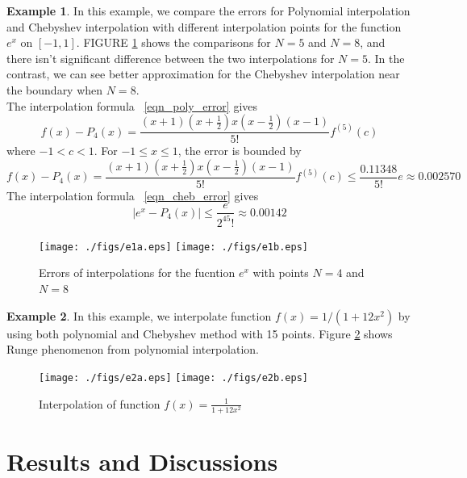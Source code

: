 \documentclass[11pt]{amsart}
\theoremstyle{definition}
\newtheorem{exmp}{Example}[section]
\begin{document}
\begin{exmp}
In this example, we compare the errors for Polynomial interpolation and Chebyshev interpolation with different interpolation points for the function $e^x$ on $[-1,1]$. FIGURE \ref{fig:e1} shows the comparisons for $N=5$ and $N=8$, and there isn't significant difference between the two interpolations for $N=5$. In the contrast, we can see better approximation for the Chebyshev interpolation near the boundary when  $N=8$.\\
The interpolation formula ~\eqref{eqn_poly_error} gives 
\begin{equation}
f(x)-P_4(x)=\frac{(x+1)(x+\frac{1}{2})x(x-\frac{1}{2})(x-1)}{5!}f^{(5)}(c)
\end{equation}
where $-1<c<1$. For $-1\leq x\leq 1$, the error is bounded by
\begin{equation*}
f(x)-P_4(x)=\frac{(x+1)(x+\frac{1}{2})x(x-\frac{1}{2})(x-1)}{5!}f^{(5)}(c)\leq \frac{0.11348}{5!}e\approx 0.002570
\end{equation*}
The interpolation formula ~\eqref{eqn_cheb_error} gives 
\begin{equation*}
|e^x-P_4(x)|\leq \frac{e}{2^45!}\approx 0.00142
\end{equation*}

\begin{figure}[H]     	\centerline{\texttt{[image: ./figs/e1a.eps]}
      	\hspace{-6pt}
     	\texttt{[image: ./figs/e1b.eps]}}
     	\hspace{-6pt}
		\caption{Errors of interpolations for the fucntion $e^x$ with points $N=4$ and $N=8$}
        \label{fig:e1}
\end{figure}
\end{exmp}

\begin{exmp}
In this example, we interpolate function $f(x)=1/(1+12x^2)$ by using both polynomial and Chebyshev method with 15 points. Figure \ref{fig:e2} shows Runge phenomenon from polynomial interpolation.
\begin{figure}[H] 	
        \centerline{\texttt{[image: ./figs/e2a.eps]}
      	\hspace{-6pt}
     	\texttt{[image: ./figs/e2b.eps]}}
     	\hspace{-6pt}
		\caption{Interpolation of function $f(x)=\frac{1}{1+12x^2}$}
        \label{fig:e2}
\end{figure}
\end{exmp}

\section{Results and Discussions}
\end{document}
